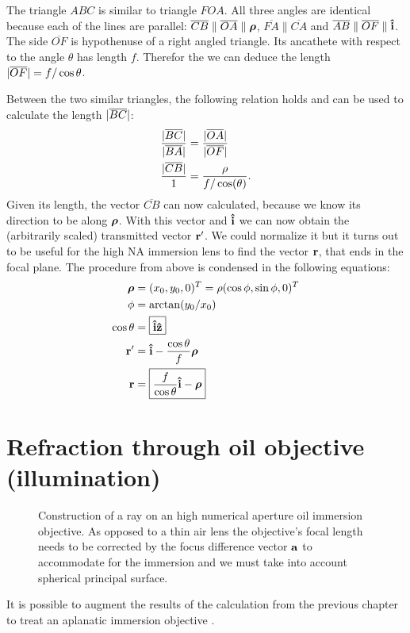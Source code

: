 The triangle $ABC$ is similar to triangle $FOA$. All three angles are
identical because each of the lines are parallel:
$\overline{CB} \parallel \overline{OA} \parallel \boldsymbol\rho$,
$\overline{FA} \parallel \overline{CA}$ and $\overline{AB} \parallel
\overline{OF} \parallel \mathbf{\hat{i}}$. The side $\overline{OF}$ is hypothenuse
of a right angled triangle. Its ancathete with respect to the angle
$\theta$ has length $f$. Therefor the we can deduce the length
$\mathopen| \overline{OF} \mathclose|=f/\cos\theta$.

Between the two similar triangles, the following relation holds and
can be used to calculate the length $\mathopen| \overline{BC} \mathclose|$:
\begin{align}
  \frac{\mathopen| \overline{BC} \mathclose|}{\mathopen| \overline{BA} \mathclose|}&=
  \frac{\mathopen| \overline{OA} \mathclose|}{\mathopen| \overline{OF} \mathclose|}\\
  \frac{\mathopen| \overline{CB} \mathclose|}{1}&=
  \frac{\rho}{f/\cos(\theta)}.
\end{align}
Given its length, the vector $\overline{CB}$ can now calculated,
because we know its direction to be along $\boldsymbol\rho$. With this vector
and $\mathbf{\hat{i}}$ we can now obtain the (arbitrarily scaled) transmitted vector
$\mathbf{r}'$. We could normalize it but it turns out to be useful for the
high NA immersion lens to find the vector $\mathbf{r}$, that ends in the focal
plane.  The procedure from above is condensed in the following
equations:
\begin{align}
  \boldsymbol\rho&=(x_0,y_0,0)^T=\rho (\cos\phi,\sin\phi,0)^T\\
  \phi&=\arctan(y_0/x_0)\\
  \cos\theta&=\boxed{\mathbf{\hat{i}}\mathbf{\hat{z}}}\\
  \mathbf{r}'&=\mathbf{\hat{i}}- \frac{\cos\theta}{f}\boldsymbol\rho\\
  \mathbf{r}&=\boxed{\frac{f}{\cos\theta} \mathbf{\hat{i}} -\boldsymbol\rho}
\end{align}

\section{Refraction through oil objective (illumination)}
\begin{figure}[!hbt]
  \centering
  
  \caption{Construction of a ray on an high numerical aperture oil
    immersion objective. As opposed to a thin air lens the objective's
    focal length needs to be corrected by the focus difference vector
    $\mathbf{a}$ to accommodate for the immersion and we must take into
    account spherical principal surface.}
\end{figure}
It is possible to augment the results of the calculation from the
previous chapter to treat an aplanatic immersion objective
\citep{Hwang2008}.

